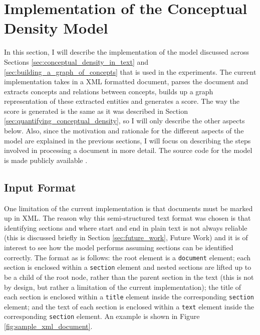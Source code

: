 \documentclass[12pt]{article}
\theoremstyle{grammarstyle}
\begin{document}
\section{Implementation of the Conceptual Density Model} \label{sec:implementation_of_the_conceptual_density_model}
In this section, I will describe the implementation of the model discussed across Sections \ref{sec:conceptual_density_in_text} and \ref{sec:building_a_graph_of_concepts} that is used in the experiments. The current implementation takes in a XML formatted document, parses the document and extracts concepts and relations between concepts, builds up a graph representation of these extracted entities and generates a score. The way the score is generated is the same as it was described in Section \ref{sec:quantifying_conceptual_density}, so I will only describe the other aspects below.
Also, since the motivation and rationale for the different aspects of the model are explained in the previous sections, I will focus on describing the steps involved in processing a document in more detail. The source code for the model is made publicly available \cite{anthony_dickson_2019_3474469}.

\subsection{Input Format}
One limitation of the current implementation is that documents must be marked up in XML. The reason why this semi-structured text format was chosen is that identifying sections and where start and end in plain text is not always reliable (this is discussed briefly in Section \ref{sec:future_work}, Future Work) and it is of interest to see how the model performs assuming sections can be identified correctly. The format as is follows: the root element is a \texttt{document} element; each section is enclosed within a \texttt{section} element and nested sections are lifted up to be a child of the root node, rather than the parent section in the text (this is not by design, but rather a limitation of the current implementation); the title of each section is enclosed within a \texttt{title} element inside the corresponding \texttt{section} element; and the text of each section is enclosed within a \texttt{text} element inside the corresponding \texttt{section} element.
An example is shown in Figure \ref{fig:sample_xml_document}.
\end{document}
